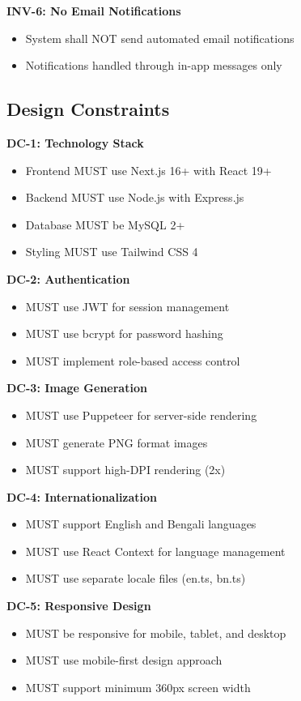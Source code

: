 \documentclass[12pt,a4paper]{article}
\begin{document}
\textbf{INV-6: No Email Notifications}
\begin{itemize}
    \item System shall NOT send automated email notifications
    \item Notifications handled through in-app messages only
\end{itemize}

\subsection{Design Constraints}

\textbf{DC-1: Technology Stack}
\begin{itemize}
    \item Frontend MUST use Next.js 16+ with React 19+
    \item Backend MUST use Node.js with Express.js
    \item Database MUST be MySQL 2+
    \item Styling MUST use Tailwind CSS 4
\end{itemize}

\textbf{DC-2: Authentication}
\begin{itemize}
    \item MUST use JWT for session management
    \item MUST use bcrypt for password hashing
    \item MUST implement role-based access control
\end{itemize}

\textbf{DC-3: Image Generation}
\begin{itemize}
    \item MUST use Puppeteer for server-side rendering
    \item MUST generate PNG format images
    \item MUST support high-DPI rendering (2x)
\end{itemize}

\textbf{DC-4: Internationalization}
\begin{itemize}
    \item MUST support English and Bengali languages
    \item MUST use React Context for language management
    \item MUST use separate locale files (en.ts, bn.ts)
\end{itemize}

\textbf{DC-5: Responsive Design}
\begin{itemize}
    \item MUST be responsive for mobile, tablet, and desktop
    \item MUST use mobile-first design approach
    \item MUST support minimum 360px screen width
\end{itemize}
\end{document}
